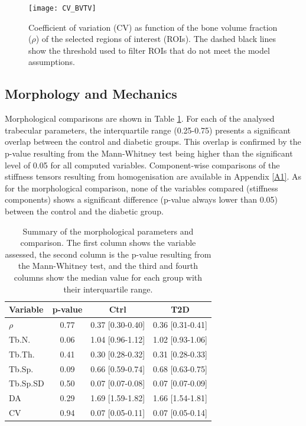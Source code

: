 \documentclass[a4paper,fleqn]{DC_ArtStyle}
\begin{document}
	\begin{figure}
		\centering
		\texttt{[image: CV\_BVTV]}
		\caption{Coefficient of variation (CV) as function of the bone volume fraction ($\rho$) of the selected regions of interest (ROIs).
				 The dashed black lines show the threshold used to filter ROIs that do not meet the model assumptions.}
		\label{FigCVBVTV}
	\end{figure}

	\subsection{Morphology and Mechanics}
	Morphological comparisons are shown in Table \ref{TabMorph}.
	For each of the analysed trabecular parameters, the interquartile range (0.25-0.75) presents a significant overlap between the control and diabetic groups.
	This overlap is confirmed by the p-value resulting from the Mann-Whitney test being higher than the significant level of 0.05 for all computed variables.
	Compo\-nent-wise comparisons of the stiffness tensors resulting from homogenisation are available in Appendix \ref{A1}.
	As for the morphological comparison, none of the variables compared (stiffness components) shows a significant difference (p-value always lower than 0.05) between the control and the diabetic group.
   
	\begin{table}[h!]
		\centering
		\caption{Summary of the morphological parameters and comparison.
				 The first column shows the variable assessed, the second column is the p-value resulting from the Mann-Whitney test, and the third and fourth columns show the median value for each group with their interquartile range.}
		\begin{tabular}{l|ccc}
			Variable & p-value & Ctrl & T2D \\\hline
			$\rho$ & 0.77 & 0.37 [0.30-0.40] & 0.36 [0.31-0.41] \\
			Tb.N. & 0.06 & 1.04 [0.96-1.12] & 1.02 [0.93-1.06] \\
			Tb.Th. &  0.41 & 0.30 [0.28-0.32] & 0.31 [0.28-0.33] \\
			Tb.Sp. & 0.09 & 0.66 [0.59-0.74] & 0.68 [0.63-0.75] \\
			Tb.Sp.SD & 0.50 & 0.07 [0.07-0.08] & 0.07 [0.07-0.09] \\
			DA & 0.29 & 1.69 [1.59-1.82] & 1.66 [1.54-1.81] \\
			CV & 0.94 & 0.07 [0.05-0.11] & 0.07 [0.05-0.14] \\
		\end{tabular}
		\label{TabMorph}
	\end{table}
\end{document}
